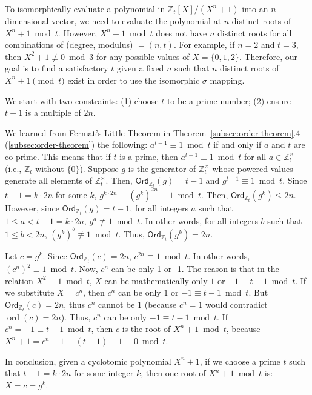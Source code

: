 To isomorphically evaluate a polynomial in $\mathbb{Z}_t[X]/(X^n + 1)$ into an $n$-dimensional vector, we need to evaluate the polynomial at $n$ distinct roots of $X^n + 1 \bmod t$. However, $X^n + 1 \bmod t$ does not have $n$ distinct roots for all combinations of (degree, modulus) $ = (n, t)$. For example, if $n = 2$ and $t = 3$, then $X^2+ 1 \not\equiv 0 \bmod 3$ for any possible values of $X = \{0, 1, 2\}$. Therefore, our goal is to find a satisfactory $t$ given a fixed $n$ such that $n$ distinct roots of $X^n + 1 \pmod t$ exist in order to use the isomorphic $\sigma$ mapping. 

We start with two constraints: (1) choose $t$ to be a prime number; (2) ensure $t-1$ is a multiple of $2n$.

We learned from Fermat's Little Theorem in Theorem~\ref*{subsec:order-theorem}.4 (\autoref{subsec:order-theorem}) the following: $a^{t - 1} \equiv 1 \bmod t$ if and only if $a$ and $t$ are co-prime. This means that if $t$ is a prime, then $a^{t - 1} \equiv 1 \bmod t$ for all $a \in \mathbb{Z}_t^{\times}$ (i.e., $\mathbb{Z}_t$ without $\{0\}$). Suppose $g$ is the generator of $\mathbb{Z}_t^{\times}$ whose powered values generate all elements of $\mathbb{Z}_t^{\times}$. Then, $\textsf{Ord}_{\mathbb{Z}_t}(g) = t - 1$ and $g^{t - 1} \equiv 1 \bmod t$. Since $t - 1 = k \cdot 2n$ for some $k$, $g^{k\cdot2n} \equiv (g^{k})^{2n} \equiv 1 \bmod t$. Then, $\textsf{Ord}_{\mathbb{Z}_t}(g^{k}) \leq 2n$. However, since $\textsf{Ord}_{\mathbb{Z}_t}(g) = t - 1$, for all integers $a$ such that $1\le a < t - 1 = k \cdot 2n$, $g^a \not\equiv 1 \bmod t$. In other words, for all integers $b$ such that $1\le b < 2n$, $(g^k)^b \not\equiv 1 \bmod t$. Thus, $\textsf{Ord}_{\mathbb{Z}_t}(g^{k}) = 2n$.

Let $c = g^k$. Since $\textsf{Ord}_{\mathbb{Z}_t}(c) = 2n$, $c^{2n} \equiv 1 \bmod t$. In other words, $(c^n)^2 \equiv 1 \bmod t$. 
Now, $c^n$ can be only 1 or -1. The reason is that in the relation $X^2 \equiv 1 \bmod t$, $X$ can be mathematically only $1$ or $-1 \equiv t - 1 \bmod t$. If we substitute $X = c^n$, then $c^n$ can be only $1$ or $-1 \equiv t - 1 \bmod t$. But $\textsf{Ord}_{\mathbb{Z}_t}(c) = 2n$, thus $c^n$ cannot be 1 (because $c^n=1$ would contradict $\operatorname{ord}(c)=2n$). Thus, $c^n$ can be only $-1 \equiv t - 1 \bmod t$. If $c^n = -1 \equiv t - 1 \bmod t$, then $c$ is the root of $X^n + 1 \bmod t$, because $X^n + 1 = c^n + 1 \equiv (t - 1) + 1 \equiv 0 \bmod t$.

In conclusion, given a cyclotomic polynomial $X^n + 1$, if we choose a prime $t$ such that $t - 1 = k \cdot 2n$ for some integer $k$, then one root of $X^n + 1 \bmod t$ is: $X = c = g^k$. 

